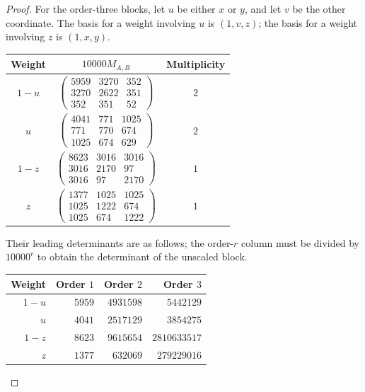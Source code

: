\begin{proof}
For the order-three blocks, let $u$ be either $x$ or $y$, and let $v$ be
the other coordinate. The basis for a weight involving $u$ is $(1,v,z)$;
the basis for a weight involving $z$ is $(1,x,y)$.
\begin{center}
\renewcommand{\arraystretch}{1.45}
\begin{tabular}{ccc}
\toprule
Weight & $10000M_{A,B}$ & Multiplicity\\
\midrule
$1-u$ & $\begin{pmatrix}5959&3270&352\\3270&2622&351\\352&351&52\end{pmatrix}$ & $2$\\
$u$   & $\begin{pmatrix}4041&771&1025\\771&770&674\\1025&674&629\end{pmatrix}$ & $2$\\
$1-z$ & $\begin{pmatrix}8623&3016&3016\\3016&2170&97\\3016&97&2170\end{pmatrix}$ & $1$\\
$z$   & $\begin{pmatrix}1377&1025&1025\\1025&1222&674\\1025&674&1222\end{pmatrix}$ & $1$\\
\bottomrule
\end{tabular}
\end{center}
Their leading determinants are as follows; the order-$r$ column must be
divided by $10000^r$ to obtain the determinant of the unscaled block.
\begin{center}
\begin{tabular}{rrrr}
\toprule
Weight & Order $1$ & Order $2$ & Order $3$\\
\midrule
$1-u$ & $5959$ & $4931598$ & $5442129$\\
$u$ & $4041$ & $2517129$ & $3854275$\\
$1-z$ & $8623$ & $9615654$ & $2810633517$\\
$z$ & $1377$ & $632069$ & $279229016$\\
\bottomrule
\end{tabular}
\end{center}


\end{proof}
